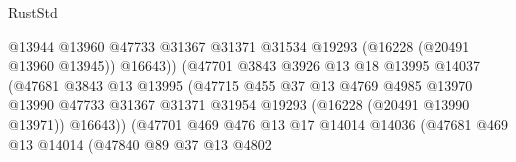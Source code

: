 \begin{lexlean}{RustStd}
\begin{coremodule}
                                            @13944
                                            @13960
                                            @47733
                                            @31367
                                            @31371
                                            @31534
                                            @19293
                                            (@16228 (@20491 @13960 @13945))
                                            @16643))
                                        (@47701
                                          @3843
                                          @3926
                                          @13
                                          @18
                                          @13995
                                          @14037
                                          (@47681
                                            @3843
                                            @13
                                            @13995
                                            (@47715
                                              @455
                                              @37
                                              @13
                                              @4769
                                              @4985
                                              @13970
                                              @13990
                                              @47733
                                              @31367
                                              @31371
                                              @31954
                                              @19293
                                              (@16228 (@20491 @13990 @13971))
                                              @16643))
                                          (@47701
                                            @469
                                            @476
                                            @13
                                            @17
                                            @14014
                                            @14036
                                            (@47681
                                              @469
                                              @13
                                              @14014
                                              (@47840
                                                @89
                                                @37
                                                @13
                                                @4802

\end{coremodule}
\end{lexlean}
